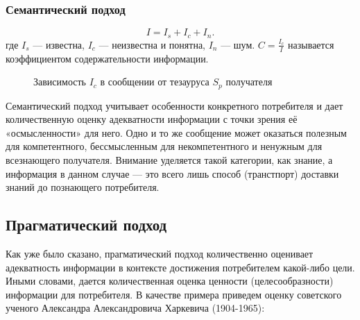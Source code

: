 \begin{frame}
\frametitle{Семантический подход}
\[I=I_s + I_c + I_n.\]
где $I_s$ --- известна, $I_c$ --- неизвестна и понятна, $I_n$ --- шум. $C=\frac{I_c}{I}$ называется коэффициентом содержательности информации.
\begin{figure}
    \begin{center}
    \end{center}
    \caption{Зависимость $I_c$ в сообщении от тезауруса $S_p$ получателя}\label{pict:semantic}
\end{figure} 
\end{frame}

Семантический подход учитывает особенности конкретного потребителя и дает количественную оценку адекватности информации с точки зрения её «осмысленности» для него. Одно и то же сообщение может оказаться полезным для компетентного, бессмысленным для некомпетентного и ненужным для всезнающего получателя. Внимание уделяется такой категории, как знание, а информация в данном случае --- это всего лишь способ (транстпорт) доставки знаний до познающего потребителя.


\subsection{Прагматический подход}

Как уже было сказано, прагматический подход количественно оценивает адекватность информации в контексте достижения потребителем какой-либо цели. Иными словами, дается количественная оценка ценности (целесообразности) информации для потребителя. В качестве примера приведем оценку советского ученого Александра Александровича Харкевича (1904-1965):

